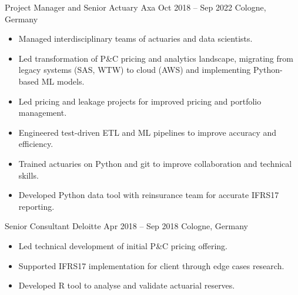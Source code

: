 \documentclass[a4paper,]{fortysecondscv}
\begin{document}
\begin{cvtable}
    \vspace{\topsep}
    \cvitemoneblock
    {Project Manager and Senior Actuary}
    {Axa}
    {Oct 2018 -- Sep 2022}
    {Cologne, Germany}
    {
        \begin{itemize}[nosep, leftmargin=12pt , label={-}] %
            \item Managed interdisciplinary teams of actuaries and data scientists.
            \item Led transformation of P\&C pricing and analytics landscape, migrating from legacy systems \/(SAS, WTW\/) to cloud \/(AWS\/) and implementing Python-based ML models.
            \item Led pricing and leakage projects for improved pricing and portfolio management.
            \item Engineered test-driven ETL and ML pipelines to improve accuracy and efficiency.
            \item Trained actuaries on Python and git to improve collaboration and technical skills.
            \item Developed Python data tool with reinsurance team for accurate IFRS17 reporting.
        \end{itemize}
    }
    \vspace{\topsep}
    \cvitemoneblock
    {Senior Consultant}
    {Deloitte}
    {Apr 2018 -- Sep 2018}
    {Cologne, Germany}
    {
        \begin{itemize}[nosep, leftmargin=12pt , label={-}] %
            \item Led technical development of initial P\&C pricing offering.
            \item Supported IFRS17 implementation for client through edge cases research.
            \item Developed R tool to analyse and validate actuarial reserves.

\end{itemize}}
\end{cvtable}
\end{document}
